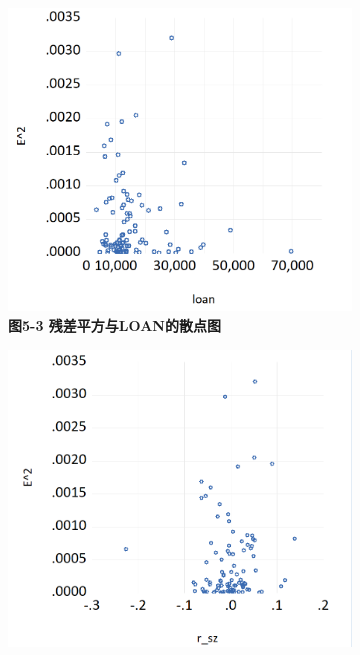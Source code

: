 \documentclass[12pt, a4paper]{article}
\numberwithin{equation}{section}
\begin{document}
\begin{figure}[h!]
\begin{subfigure}{0.45\textwidth}
    \end{subfigure}
    \vspace{0.05\textwidth}
    \begin{subfigure}{0.45\textwidth}
        \includegraphics[width=\textwidth]{./img/loan-e2.png}
        \captionsetup{labelformat=empty}
        \caption{\textbf{\fontsize{9pt}{11pt}\selectfont 图5-3 残差平方与LOAN的散点图}}
    \end{subfigure}
    \hspace{0.05\textwidth}
    \begin{subfigure}{0.45\textwidth}
        \includegraphics[width=\textwidth]{./img/r_sz-e2.png}

\end{subfigure}
\end{figure}
\end{document}
